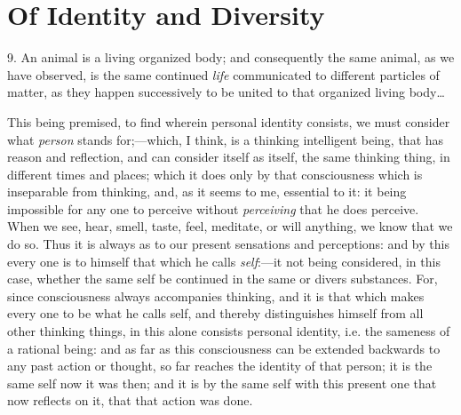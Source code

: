
\author{John Locke}
\chapter[Of Identity and Diversity, excerpt]{Of Identity and Diversity}

9. An animal is a living organized body; and consequently
the same animal, as we have observed, is the same continued
\textit{life} communicated to different particles of matter, as they
happen successively to be united to that organized living body\ldots

This being premised, to find wherein personal
identity consists, we must consider what \textit{person} stands
for;---which, I think, is a thinking intelligent being, that has
reason and reflection, and can consider itself as itself, the same
thinking thing, in different times and places; which it does only by
that consciousness which is inseparable from thinking, and, 
as it seems to me, essential to it: it being impossible for any one
to perceive without \textit{perceiving} that he does perceive. When we
see, hear, smell, taste, feel, meditate, or will anything, we know
that we do so. Thus it is always as to our present sensations and
perceptions: and by this every one is to himself that which he calls
\textit{self}:---it not being considered, in this case, whether the
same self be continued in the same or divers substances. For, since
consciousness always accompanies thinking, and it is that which
makes every one to be what he calls self, and thereby distinguishes
himself from all other thinking things, in this alone consists
personal identity, i.e. the sameness of a rational being: and as far
as this consciousness can be extended backwards to any past action or
thought, so far reaches the identity of that person; it is the same
self now it was then; and it is by the same self with this present one
that now reflects on it, that that action was done.


